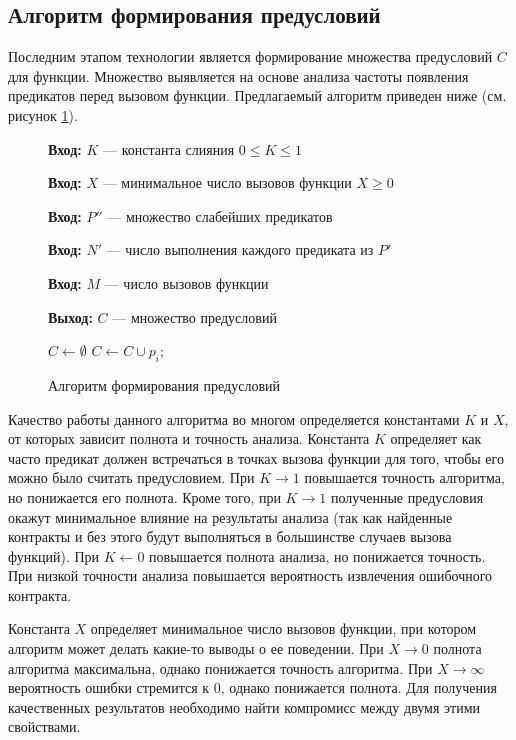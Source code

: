 \subsection{Алгоритм формирования предусловий}
Последним этапом технологии является формирование множества предусловий $C$ для функции. Множество выявляется на основе анализа частоты появления предикатов перед вызовом функции. Предлагаемый
алгоритм приведен ниже (см. рисунок \ref{image:extractionAlgoritm}).
\begin{figure}[h!]
\textbf{Вход:} $K$ --- константа слияния $0 \le K \le 1$

\textbf{Вход:} $X$ --- минимальное число вызовов функции $X \ge 0$

\textbf{Вход:} $P''$ --- множество слабейших предикатов

\textbf{Вход:} $N'$ --- число выполнения каждого предиката из $P'$

\textbf{Вход:} $M$ --- число вызовов функции

\textbf{Выход:} $C$ --- множество предусловий
\begin{algorithmic}[1]
\State $C \leftarrow \emptyset$
	\State \Return
\EndIf
{}
	\State $C \gets C \cup p_i$;
    \EndIf
\EndFor
\end{algorithmic}
\caption{Алгоритм формирования предусловий}
\label{image:extractionAlgoritm}
\end{figure}

Качество работы данного алгоритма во многом определяется константами $K$ и $X$, от которых зависит полнота и точность анализа. Константа $K$ определяет как часто предикат должен встречаться в точках вызова функции для того, чтобы его можно было считать предусловием. При $K \to 1$ повышается точность алгоритма, но понижается его полнота. Кроме того, при $K \to 1$ полученные предусловия окажут минимальное влияние на результаты анализа (так как найденные контракты и без этого будут выполняться в большинстве случаев вызова функций). При $K \leftarrow 0$ повышается полнота анализа, но понижается точность. При низкой точности анализа повышается вероятность извлечения ошибочного контракта. 

Константа $X$ определяет минимальное число вызовов функции, при котором алгоритм может делать какие-то выводы о ее поведении. При $X \to 0$ полнота алгоритма максимальна, однако  понижается точность алгоритма. При $X \to \infty$ вероятность ошибки стремится к 0, однако понижается полнота. Для получения качественных результатов необходимо найти компромисс между двумя этими свойствами.

